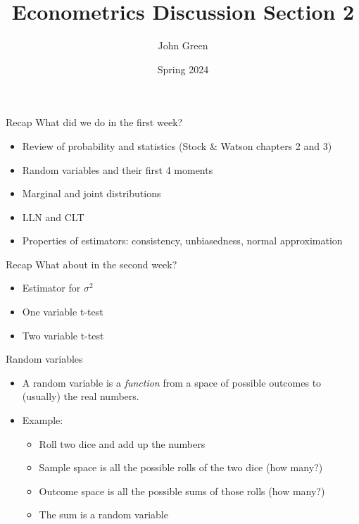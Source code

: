 \documentclass[aspectratio=169]{beamer}
\title{Econometrics Discussion Section 2}
\author{John Green}
\date{Spring 2024}
\begin{document}
\begin{frame}
    \titlepage 
\end{frame}

\begin{frame}{Recap}
    What did we do in the first week?
    \begin{itemize}
        \item Review of probability and statistics (Stock \& Watson chapters 2 and 3)
        \item Random variables and their first 4 moments
        \item Marginal and joint distributions
        \item LLN and CLT
        \item Properties of estimators: consistency, unbiasedness, normal approximation
    \end{itemize}
\end{frame}

\begin{frame}{Recap}
    What about in the second week?
    \begin{itemize}
        \item Estimator for $\sigma^2$
        \item One variable t-test
        \item Two variable t-test
    \end{itemize}
\end{frame}

\begin{frame}{Random variables}
    \begin{itemize}
        \item A random variable is a \textit{function} from a space of possible outcomes to (usually) the real numbers.
        \item Example: 
        \begin{itemize}
            \item Roll two dice and add up the numbers
            \item Sample space is all the possible rolls of the two dice (how many?)
            \item Outcome space is all the possible sums of those rolls (how many?)
            \item The sum is a random variable
        \end{itemize} 
    \end{itemize}
\end{frame}
\end{document}
